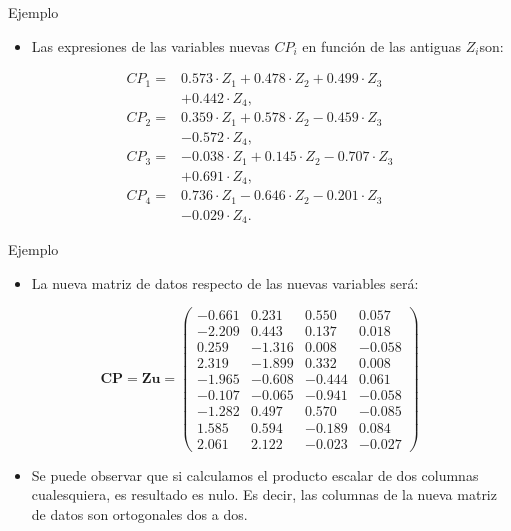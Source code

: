 \documentclass[
  ignorenonframetext,
]{beamer}
\providecommand{\tightlist}{%
  \setlength{\itemsep}{0pt}\setlength{\parskip}{0pt}}
\begin{document}
\begin{frame}{Ejemplo}
\label{ejemplo-13}
\begin{itemize}
\tightlist
\item
  Las expresiones de las variables nuevas \(CP_i\) en función de las
  antiguas \(Z_i\)son:
\end{itemize}

\[
\begin{array}{rl}
CP_1 = & 0.573\cdot Z_1 +0.478\cdot Z_2 +0.499\cdot Z_3\\ & +0.442 \cdot Z_4,
\\
CP_2 = & 0.359\cdot Z_1 + 0.578\cdot Z_2 -0.459 \cdot Z_3 \\ & -0.572 \cdot Z_4,
\\
CP_3 = & -0.038\cdot Z_1 +0.145 \cdot Z_2 -0.707\cdot Z_3 \\ &+0.691\cdot Z_4,
\\
CP_4 = & 0.736 \cdot Z_1 - 0.646\cdot Z_2 - 0.201\cdot Z_3 \\ & - 0.029 \cdot
Z_4.
\end{array}
\]
\end{frame}

\begin{frame}{Ejemplo}
\label{ejemplo-14}
\begin{itemize}
\tightlist
\item
  La nueva matriz de datos respecto de las nuevas variables será:
\end{itemize}

\[
\mathbf{CP} = \mathbf{Z} \mathbf{u} =
\begin{pmatrix}
-0.661 & 0.231 & 0.550 & 0.057 \\
 -2.209 & 0.443 & 0.137 & 0.018 \\
 0.259 & -1.316 & 0.008 & -0.058 \\
 2.319 & -1.899 & 0.332 & 0.008 \\
 -1.965 & -0.608 & -0.444 & 0.061 \\
 -0.107 & -0.065 & -0.941 & -0.058 \\
 -1.282 & 0.497 & 0.570 & -0.085 \\
 1.585 & 0.594 & -0.189 & 0.084 \\
 2.061 & 2.122 & -0.023 & -0.027 
\end{pmatrix}
\]

\begin{itemize}
\tightlist
\item
  Se puede observar que si calculamos el producto escalar de dos
  columnas cualesquiera, es resultado es nulo. Es decir, las columnas de
  la nueva matriz de datos son ortogonales dos a dos.
\end{itemize}
\end{frame}
\end{document}

